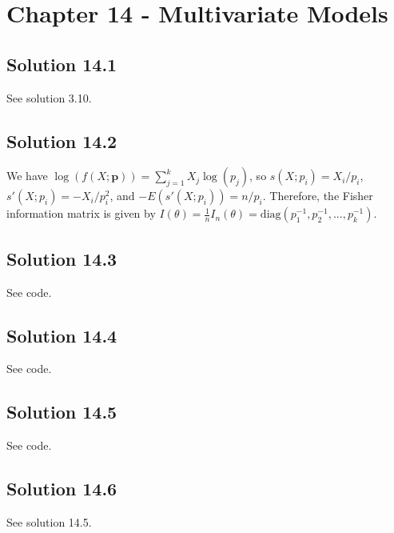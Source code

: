 \section*{Chapter 14 - Multivariate Models}

\subsection*{Solution 14.1}

See solution 3.10.


\subsection*{Solution 14.2}

We have $\log(f(X;\bm{p})) = \sum_{j = 1}^k X_j \log(p_j)$, so $s(X;p_i) = X_i/p_i$, $s'(X;p_i) = -X_i/p_i^2$, and $-E(s'(X;p_i)) = n/p_i$.
Therefore, the Fisher information matrix is given by $I(\theta) = \frac{1}{n} I_n(\theta) = \mathrm{diag}(p_1^{-1}, p_2^{-1}, ..., p_k^{-1})$.


\subsection*{Solution 14.3}

See code.


\subsection*{Solution 14.4}

See code.


\subsection*{Solution 14.5}

See code.


\subsection*{Solution 14.6}

See solution 14.5.
